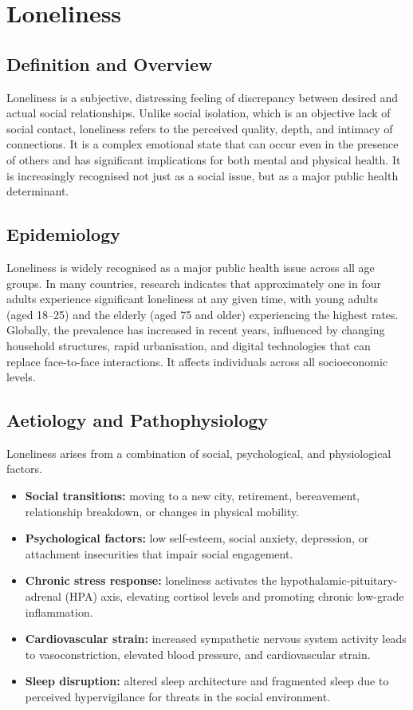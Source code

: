 \chapter{Loneliness}

\section*{Definition and Overview}
Loneliness is a subjective, distressing feeling of discrepancy between desired and actual social relationships. Unlike social isolation, which is an objective lack of social contact, loneliness refers to the perceived quality, depth, and intimacy of connections. It is a complex emotional state that can occur even in the presence of others and has significant implications for both mental and physical health. It is increasingly recognised not just as a social issue, but as a major public health determinant.

\section*{Epidemiology}
Loneliness is widely recognised as a major public health issue across all age groups. In many countries, research indicates that approximately one in four adults experience significant loneliness at any given time, with young adults (aged 18--25) and the elderly (aged 75 and older) experiencing the highest rates. Globally, the prevalence has increased in recent years, influenced by changing household structures, rapid urbanisation, and digital technologies that can replace face-to-face interactions. It affects individuals across all socioeconomic levels.

\section*{Aetiology and Pathophysiology}
Loneliness arises from a combination of social, psychological, and physiological factors.
\begin{itemize}
    \item \textbf{Social transitions:} moving to a new city, retirement, bereavement, relationship breakdown, or changes in physical mobility.
    \item \textbf{Psychological factors:} low self-esteem, social anxiety, depression, or attachment insecurities that impair social engagement.
    \item \textbf{Chronic stress response:} loneliness activates the hypothalamic-pituitary-adrenal (HPA) axis, elevating cortisol levels and promoting chronic low-grade inflammation.
    \item \textbf{Cardiovascular strain:} increased sympathetic nervous system activity leads to vasoconstriction, elevated blood pressure, and cardiovascular strain.
    \item \textbf{Sleep disruption:} altered sleep architecture and fragmented sleep due to perceived hypervigilance for threats in the social environment.
\end{itemize}

